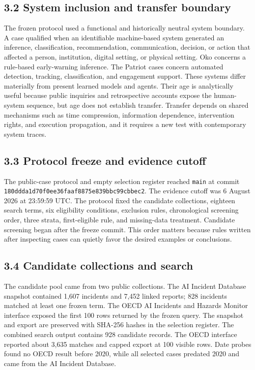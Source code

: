 \documentclass[11pt]{article}
\begin{document}
\subsection*{3.2 System inclusion and transfer boundary}
The frozen protocol used a functional and historically neutral system boundary. A case qualified when an identifiable machine-based system generated an inference, classification, recommendation, communication, decision, or action that affected a person, institution, digital setting, or physical setting. Oko concerns a rule-based early-warning inference. The Patriot cases concern automated detection, tracking, classification, and engagement support. These systems differ materially from present learned models and agents. Their age is analytically useful because public inquiries and retrospective accounts expose the human-system sequence, but age does not establish transfer. Transfer depends on shared mechanisms such as time compression, information dependence, intervention rights, and execution propagation, and it requires a new test with contemporary system traces.
\subsection*{3.3 Protocol freeze and evidence cutoff}
The public-case protocol and empty selection register reached \texttt{main} at commit \texttt{180ddda1\allowbreak{}d70f0ee3\allowbreak{}6faaf887\allowbreak{}5e839bbc\allowbreak{}99cbbec2}. The evidence cutoff was 6 August 2026 at 23:59:59 UTC. The protocol fixed the candidate collections, eighteen search terms, six eligibility conditions, exclusion rules, chronological screening order, three strata, first-eligible rule, and missing-data treatment. Candidate screening began after the freeze commit. This order matters because rules written after inspecting cases can quietly favor the desired examples or conclusions.
\subsection*{3.4 Candidate collections and search}
The candidate pool came from two public collections. The AI Incident Database snapshot contained 1,607 incidents and 7,452 linked reports; 828 incidents matched at least one frozen term. The OECD AI Incidents and Hazards Monitor interface exposed the first 100 rows returned by the frozen query. The snapshot and export are preserved with SHA-256 hashes in the selection register. The combined search output contains 928 candidate records. The OECD interface reported about 3,635 matches and capped export at 100 visible rows. Date probes found no OECD result before 2020, while all selected cases predated 2020 and came from the AI Incident Database.
\end{document}
